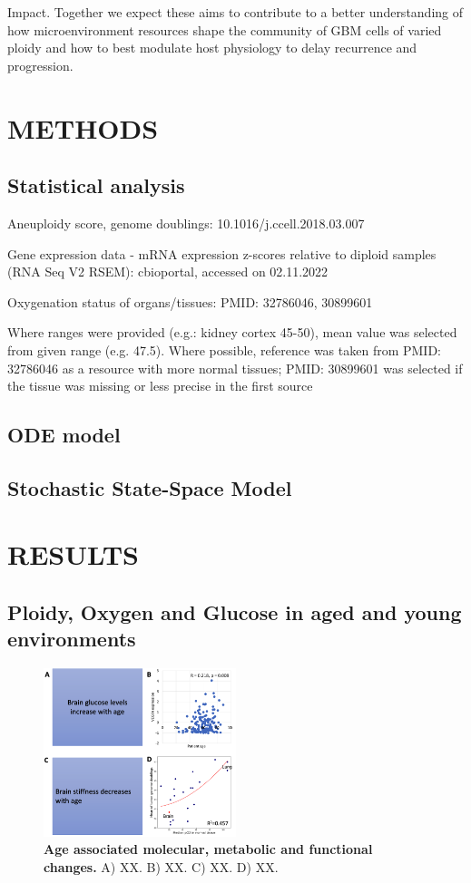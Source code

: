 \documentclass[times,twoside]{zHenriquesLab-StyleBioRxiv}
\begin{document}
Impact.   Together we expect these aims to contribute to a better understanding of how microenvironment resources shape the community of GBM cells of varied ploidy and how to best modulate host physiology to delay recurrence and progression.

\section{METHODS}

\subsection{Statistical analysis} 
Aneuploidy score, genome doublings: 10.1016/j.ccell.2018.03.007

Gene expression data - mRNA expression z-scores relative to diploid samples (RNA Seq V2 RSEM): cbioportal, accessed on 02.11.2022

Oxygenation status of organs/tissues: PMID: 32786046, 30899601

Where ranges were provided (e.g.: kidney cortex 45-50), mean value was selected from given range (e.g. 47.5). Where possible, reference was taken from PMID: 32786046 as a resource with more normal tissues; PMID: 30899601 was selected if the tissue was missing or less precise in the first source

\subsection{ODE model} 

\subsection{Stochastic State-Space Model} 

\section{RESULTS}
\subsection{Ploidy, Oxygen and Glucose in aged and young environments}

\begin{figure}
\includegraphics[width=0.5\textwidth]{figs/Fig1.png}
\caption{\textbf{Age associated molecular, metabolic and functional changes.}
A) XX.
B) XX.
C) XX.
D) XX.
} 
\label{fig:stats}
\end{figure}
\end{document}
